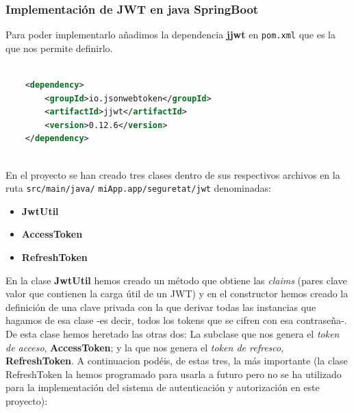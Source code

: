 \documentclass[a4paper,12pt]{report}
\begin{document}
				

				
				
				\subsubsection{Implementación de JWT en java SpringBoot}
				\label{sec:implementacionJWTjava}
				Para poder implementarlo añadimos la dependencia \textbf{jjwt} en \texttt{pom.xml} que es la que nos permite definirlo.
				
				
				\begin{lstlisting}[language=XML, basicstyle=\ttfamily\small, keywordstyle=\color{red}]
					
	<dependency>
		<groupId>io.jsonwebtoken</groupId>
		<artifactId>jjwt</artifactId>
		<version>0.12.6</version>
	</dependency>
					
				\end{lstlisting}
				
				
		En el proyecto se han creado tres clases dentro de sus respectivos archivos en la ruta \texttt{src/main/java/} \texttt{miApp.app/seguretat/jwt} denominadas:
		
		\begin{itemize}
			\setlength{\itemsep}{-.4em}
			\item \textbf{JwtUtil}
			\item \textbf{AccessToken}
			\item \textbf{RefreshToken}
		\end{itemize}
		  
		
		En la clase \textbf{JwtUtil} hemos creado un método que obtiene las \textit{claims} (pares clave valor que contienen la carga útil de un JWT) y en el constructor hemos creado la definición de una clave privada con la que derivar todas las instancias que hagamos de esa clase -es decir, todos los tokens que se cifren con esa contraseña-. De esta clase hemos heretado las otras dos: La subclase que nos genera el \textit{token de acceso}, \textbf{AccessToken}; y la que nos genera el \textit{token de refresco}, \textbf{RefreshToken}. A continuacion podéis, de estas tres, la más importante (la clase RefreshToken la hemos programado para usarla a futuro pero no se ha utilizado para la implementación del sistema de autenticación y autorización en este proyecto): 
		
		
\end{document}
